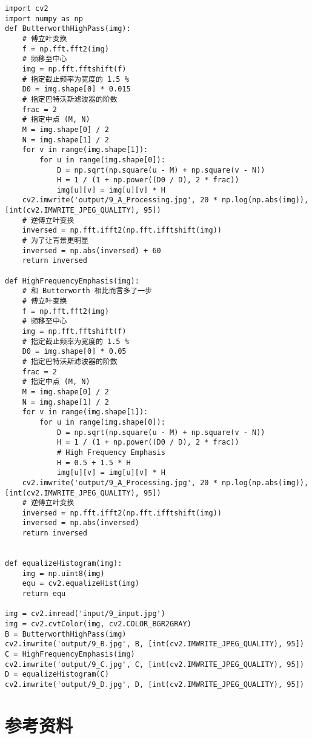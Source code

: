 \documentclass[11pt]{ctexart}
\begin{document}
\lstset{language=python}
\begin{lstlisting}
import cv2
import numpy as np
def ButterworthHighPass(img):
	# 傅立叶变换
	f = np.fft.fft2(img)
	# 频移至中心
	img = np.fft.fftshift(f)
	# 指定截止频率为宽度的 1.5 %
	D0 = img.shape[0] * 0.015
	# 指定巴特沃斯滤波器的阶数
	frac = 2
	# 指定中点 (M, N)
	M = img.shape[0] / 2
	N = img.shape[1] / 2
	for v in range(img.shape[1]):
		for u in range(img.shape[0]):
			D = np.sqrt(np.square(u - M) + np.square(v - N))
			H = 1 / (1 + np.power((D0 / D), 2 * frac))
			img[u][v] = img[u][v] * H
	cv2.imwrite('output/9_A_Processing.jpg', 20 * np.log(np.abs(img)), [int(cv2.IMWRITE_JPEG_QUALITY), 95])
	# 逆傅立叶变换
	inversed = np.fft.ifft2(np.fft.ifftshift(img))
	# 为了让背景更明显
	inversed = np.abs(inversed) + 60
	return inversed

def HighFrequencyEmphasis(img):
	# 和 Butterworth 相比而言多了一步
	# 傅立叶变换
	f = np.fft.fft2(img)
	# 频移至中心
	img = np.fft.fftshift(f)
	# 指定截止频率为宽度的 1.5 %
	D0 = img.shape[0] * 0.05
	# 指定巴特沃斯滤波器的阶数
	frac = 2
	# 指定中点 (M, N)
	M = img.shape[0] / 2
	N = img.shape[1] / 2
	for v in range(img.shape[1]):
		for u in range(img.shape[0]):
			D = np.sqrt(np.square(u - M) + np.square(v - N))
			H = 1 / (1 + np.power((D0 / D), 2 * frac))
			# High Frequency Emphasis
			H = 0.5 + 1.5 * H
			img[u][v] = img[u][v] * H
	cv2.imwrite('output/9_A_Processing.jpg', 20 * np.log(np.abs(img)), [int(cv2.IMWRITE_JPEG_QUALITY), 95])
	# 逆傅立叶变换
	inversed = np.fft.ifft2(np.fft.ifftshift(img))
	inversed = np.abs(inversed)
	return inversed


def equalizeHistogram(img):
	img = np.uint8(img)
	equ = cv2.equalizeHist(img)
	return equ

img = cv2.imread('input/9_input.jpg')
img = cv2.cvtColor(img, cv2.COLOR_BGR2GRAY)
B = ButterworthHighPass(img)
cv2.imwrite('output/9_B.jpg', B, [int(cv2.IMWRITE_JPEG_QUALITY), 95])
C = HighFrequencyEmphasis(img)
cv2.imwrite('output/9_C.jpg', C, [int(cv2.IMWRITE_JPEG_QUALITY), 95])
D = equalizeHistogram(C)
cv2.imwrite('output/9_D.jpg', D, [int(cv2.IMWRITE_JPEG_QUALITY), 95])
\end{lstlisting}


\section{参考资料}
\end{document}
